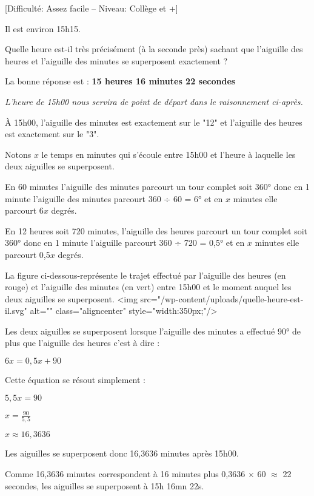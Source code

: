 
%

\begin{center}
\end{center}
[Difficulté: Assez facile – Niveau: Collège et +]

\par
Il est environ 15h15.
\par
Quelle heure est-il très précisément (à la seconde près) sachant que l'aiguille des heures et l'aiguille des minutes se superposent exactement ?

\begin{solution}
\begin{note}La bonne réponse est : \textbf{15 heures 16 minutes 22 secondes}\end{note}
\textit{L'heure de 15h00 nous servira de point de départ dans le raisonnement ci-après.}
\par
À 15h00, l'aiguille des minutes est exactement sur le "12" et l'aiguille des heures est exactement sur le "3".
\par
Notons $x$ le temps en minutes qui s'écoule entre 15h00 et l'heure à laquelle les deux aiguilles se superposent.
\par
En  60 minutes l'aiguille des minutes parcourt un tour complet soit 360° donc en 1 minute l'aiguille des minutes parcourt  360 ÷ 60 = 6° et en $x$ minutes elle parcourt 6$x$ degrés.
\par
En 12 heures soit 720 minutes, l'aiguille des heures parcourt un tour complet soit 360° donc en 1 minute l'aiguille parcourt 360  ÷ 720 = 0,5° et en $x$ minutes elle parcourt 0,5$x$ degrés.
\par
La figure ci-dessous-représente le trajet effectué par l'aiguille des heures (en rouge) et l'aiguille des minutes (en vert) entre 15h00 et le moment auquel les deux aiguilles se superposent.
<img src="/wp-content/uploads/quelle-heure-est-il.svg" alt="" class="aligncenter" style="width:350px;"/>

\begin{center}
\end{center}
Les deux aiguilles se superposent lorsque l'aiguille des minutes a effectué 90° de plus que l'aiguille des heures c'est à dire :
\par
$6x=0,5x+90$
\par
Cette équation se résout simplement :
\par
$5,5x=90$
\par
$x=\frac{90}{5,5}$
\par
$x \approx 16,3636$
\par
Les aiguilles se superposent donc 16,3636 minutes après 15h00.
\par
Comme 16,3636 minutes correspondent à 16 minutes plus 0,3636 $\times$ 60 $\approx$ 22 secondes, les aiguilles se superposent à 15h 16mn 22s.
\end{solution}
